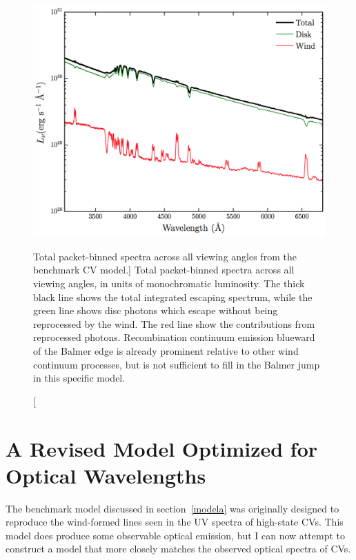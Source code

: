\begin{figure} 
\centering
\includegraphics[width=1.0\textwidth]{figures/05-cvpaper/modela_escaping.png}
\caption
[Total packet-binned spectra across all viewing angles from the benchmark CV model.]
{Total packet-binned spectra across all viewing angles, in units
of monochromatic luminosity.
The thick black line shows the total 
integrated escaping spectrum, 
while the green line shows disc photons which escape without being reprocessed by
the wind. The red line show the contributions from reprocessed photons. 
Recombination continuum emission blueward of the Balmer 
edge is already prominent relative to other wind continuum processes, but is not sufficient
to fill in the Balmer jump in this specific model.}
\label{cont}
\end{figure} 





%
%

\section{A Revised Model Optimized for Optical Wavelengths}
\label{sec:modelb}
The benchmark model discussed in section~\ref{modela} was originally
designed to reproduce the wind-formed lines seen in the UV spectra of
high-state CVs. This model does produce some observable
optical emission, but I can now attempt to construct a model that more closely 
matches the observed optical spectra of CVs. 

